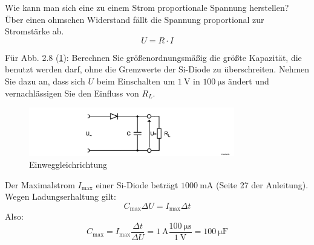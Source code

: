 \documentclass{article}
\theoremstyle{definition}
\begin{document}
\label{G}
\begin{voraufgabe}{Wie kann man sich eine zu einem Strom proportionale Spannung herstellen?}
    Über einen ohmschen Widerstand fällt die Spannung proportional zur Stromstärke ab.
     \[U = R \cdot I\]

\end{voraufgabe}

\begin{voraufgabe}{Für Abb. 2.8 (\ref{fig:Abb2.8}): Berechnen Sie größenordnungsmäßig die größte Kapazität, die benutzt werden darf, ohne die Grenzwerte der Si-Diode zu überschreiten. Nehmen Sie dazu an, dass sich $U$ beim Einschalten um $\SI{1}{\volt}$ in $\SI{100}{\micro\second}$ ändert und vernachlässigen Sie den Einfluss von $R_L$.}
    \begin{figure}[H]
        \centering
        \includegraphics[width=0.8\textwidth]{figs/fig2_8.png}
        \caption{Einweggleichrichtung\cite{anleitung}}
        \label{fig:Abb2.8}
    \end{figure}
Der Maximalstrom $I_\mathrm{max}$ einer Si-Diode beträgt $\SI{1000}{\milli\ampere}$ (Seite 27 der Anleitung\cite{anleitung}). Wegen Ladungserhaltung gilt:
\begin{equation*}
    C_\mathrm{max} \Delta U = I_\mathrm{max} \Delta t
\end{equation*}
Also:
\begin{equation*}
    C_\mathrm{max} = I_\mathrm{max} \frac{\Delta t}{\Delta U} = \SI{1}{\ampere} \frac{\SI{100}{\micro\second}}{\SI{1}{\volt}} = \SI{100}{\micro\farad}
\end{equation*}
\end{voraufgabe}
\end{document}
